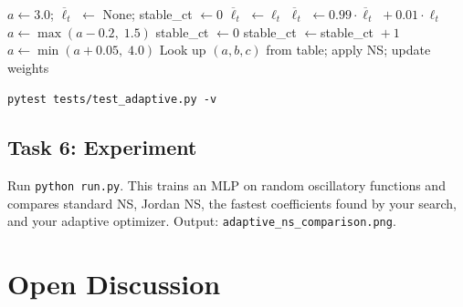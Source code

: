 \documentclass[11pt,a4paper]{article}
\begin{document}
\begin{algorithm}[H]
\caption{Adaptive coefficient scheduling}
\begin{algorithmic}[1]
\State $a \leftarrow 3.0$; \quad $\overline{\ell}_t$ $\leftarrow$ None; \quad stable\_ct $\leftarrow 0$
     \State $\overline{\ell}_t$ $\leftarrow \ell_t$
    \Else
        \State $\overline{\ell}_t$ $\leftarrow 0.99 \cdot {}$$\overline{\ell}_t$ ${}+ 0.01 \cdot \ell_t$
        \qquad {}
            \State $a \leftarrow \max(a - 0.2,\; 1.5)$
            \State stable\_ct $\leftarrow 0$
        \Else
            \State stable\_ct $\leftarrow {}$stable\_ct ${}+ 1$
            \qquad {}
                \State $a \leftarrow \min(a + 0.05,\; 4.0)$
            \EndIf
        \EndIf
    \EndIf
    \State Look up $(a,b,c)$ from table; apply NS; update weights
\EndFor
\end{algorithmic}
\end{algorithm}

\begin{mdframed}
    \texttt{pytest tests/test\_adaptive.py -v}
\end{mdframed}

\subsection*{Task 6: Experiment}

Run \texttt{python run.py}.  This trains an MLP on random oscillatory
functions and compares standard NS, Jordan NS, the fastest coefficients
found by your search, and your adaptive optimizer.  Output:
\texttt{adaptive\_ns\_comparison.png}.

\section{Open Discussion}
\end{document}
